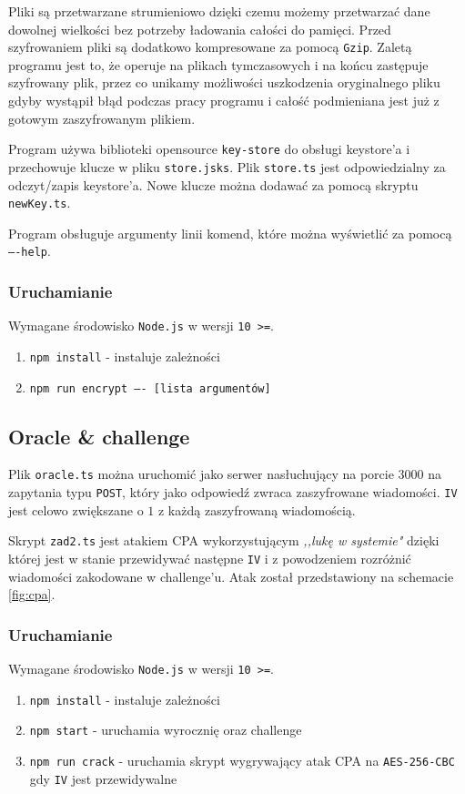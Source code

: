 \documentclass[a4paper,11pt]{article}
\theoremstyle{mytheor}
\begin{document}
Pliki są przetwarzane strumieniowo dzięki czemu możemy przetwarzać dane dowolnej wielkości bez potrzeby ładowania całości do pamięci. Przed szyfrowaniem pliki są dodatkowo kompresowane za pomocą \texttt{Gzip}. Zaletą programu jest to, że operuje na plikach tymczasowych i na końcu zastępuje szyfrowany plik, przez co unikamy możliwości uszkodzenia oryginalnego pliku gdyby wystąpił błąd podczas pracy programu i całość podmieniana jest już z gotowym zaszyfrowanym plikiem.

Program używa biblioteki opensource \texttt{key-store} do obsługi keystore'a i przechowuje klucze w pliku \texttt{store.jsks}. Plik \texttt{store.ts} jest odpowiedzialny za odczyt/zapis keystore'a. Nowe klucze można dodawać za pomocą skryptu \texttt{newKey.ts}.

Program obsługuje argumenty linii komend, które można wyświetlić za pomocą \texttt{----help}.

\subsubsection*{Uruchamianie}
Wymagane środowisko \texttt{Node.js} w wersji \texttt{10 >=}.
\begin{enumerate}
    \item \texttt{npm install} - instaluje zależności
    \item \texttt{npm run encrypt ---- [lista argumentów]}
\end{enumerate}

\subsection*{Oracle \& challenge}
Plik \texttt{oracle.ts} można uruchomić jako serwer nasłuchujący na porcie $3000$ na zapytania typu \texttt{POST}, który jako odpowiedź zwraca zaszyfrowane wiadomości. \texttt{IV} jest celowo zwiększane o $1$ z każdą zaszyfrowaną wiadomością.

Skrypt \texttt{zad2.ts} jest atakiem CPA wykorzystującym \textit{,,lukę w systemie"} dzięki której jest w stanie przewidywać następne \texttt{IV} i z powodzeniem rozróżnić wiadomości zakodowane w challenge'u. Atak został przedstawiony na schemacie \ref{fig:cpa}.

\subsubsection*{Uruchamianie}
Wymagane środowisko \texttt{Node.js} w wersji \texttt{10 >=}.
\begin{enumerate}
    \item \texttt{npm install} - instaluje zależności
    \item \texttt{npm start} - uruchamia wyrocznię oraz challenge
    \item \texttt{npm run crack} - uruchamia skrypt wygrywający atak CPA na \texttt{AES-256-CBC} gdy \texttt{IV} jest przewidywalne
\end{enumerate}
\end{document}
